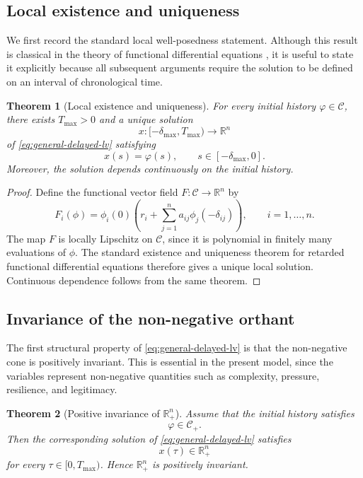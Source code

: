 \documentclass[11pt]{article}
\newtheorem{theorem}{Theorem}
\begin{document}
\subsection{Local existence and uniqueness}

We first record the standard local well-posedness statement. Although this result
is classical in the theory of functional differential equations
\cite{hale1993introduction,Kuang1993}, it is useful to state it explicitly
because all subsequent arguments require the solution to be defined on an
interval of chronological time.

\begin{theorem}[Local existence and uniqueness]
	\label{thm:local-existence}
	For every initial history \(\varphi\in\mathcal{C}\), there exists
	\(T_{\max}>0\) and a unique solution
	\[
	x:[-\delta_{\max},T_{\max})\to\mathbb{R}^{n}
	\]
	of \eqref{eq:general-delayed-lv} satisfying    
	\[
	x(s)=\varphi(s),
	\qquad s\in[-\delta_{\max},0].
	\]
	Moreover, the solution depends continuously on the initial history.
\end{theorem}

\begin{proof}
	Define the functional vector field \(F:\mathcal{C}\to\mathbb{R}^{n}\) by
	\[
	F_i(\phi)
	=
	\phi_i(0)
	\left(
	r_i+\sum_{j=1}^{n}a_{ij}\phi_j(-\delta_{ij})
	\right),
	\qquad i=1,\ldots,n.
	\]
	The map \(F\) is locally Lipschitz on \(\mathcal{C}\), since it is polynomial in
	finitely many evaluations of \(\phi\). The standard existence and uniqueness
	theorem for retarded functional differential equations therefore gives a unique
	local solution. Continuous dependence follows from the same theorem.
\end{proof}

\subsection{Invariance of the non-negative orthant}

The first structural property of \eqref{eq:general-delayed-lv} is that the
non-negative cone is positively invariant. This is essential in the present
model, since the variables represent non-negative quantities such as complexity,
pressure, resilience, and legitimacy.

\begin{theorem}[Positive invariance of \(\mathbb{R}^{n}_{+}\)]
	\label{thm:positive-invariance}
	Assume that the initial history satisfies
	\[
	\varphi\in\mathcal{C}_{+}.
	\]
	Then the corresponding solution of \eqref{eq:general-delayed-lv} satisfies
	\[
	x(\tau)\in\mathbb{R}^{n}_{+}
	\]
	for every \(\tau\in[0,T_{\max})\). Hence \(\mathbb{R}^{n}_{+}\) is positively
	invariant.
\end{theorem}
\end{document}

